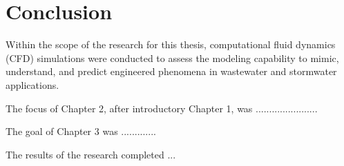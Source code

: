 
\chapter{Conclusion}

\begin{onehalfspace}
Within the scope of the research for this thesis, computational fluid
dynamics (CFD) simulations were conducted to assess the modeling capability
to mimic, understand, and predict engineered phenomena in wastewater
and stormwater applications. 

The focus of Chapter 2, after introductory Chapter 1, was .......................

The goal of Chapter 3 was .............

The results of the research completed ... 
\end{onehalfspace}

